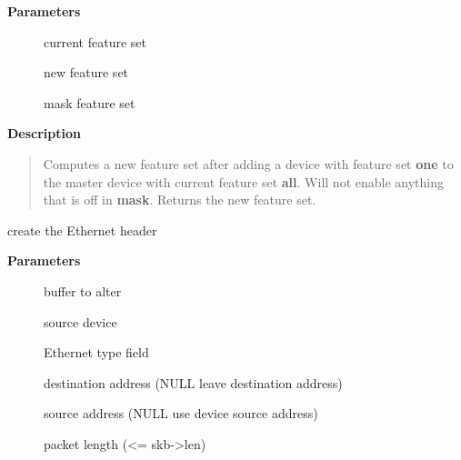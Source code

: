 \documentclass[a4paper,8pt,english]{sphinxmanual}
\begin{document}
\textbf{Parameters}
\begin{description}
\item[{}] \leavevmode
current feature set

\item[{}] \leavevmode
new feature set

\item[{}] \leavevmode
mask feature set

\end{description}

\textbf{Description}
\begin{quote}

Computes a new feature set after adding a device with feature set
\textbf{one} to the master device with current feature set \textbf{all}.  Will not
enable anything that is off in \textbf{mask}. Returns the new feature set.
\end{quote}

\begin{fulllineitems}
\label{networking/kapi:c.eth_header}
create the Ethernet header

\end{fulllineitems}


\textbf{Parameters}
\begin{description}
\item[{}] \leavevmode
buffer to alter

\item[{}] \leavevmode
source device

\item[{}] \leavevmode
Ethernet type field

\item[{}] \leavevmode
destination address (NULL leave destination address)

\item[{}] \leavevmode
source address (NULL use device source address)

\item[{}] \leavevmode
packet length (\textless{}= skb-\textgreater{}len)

\end{description}
\end{document}
